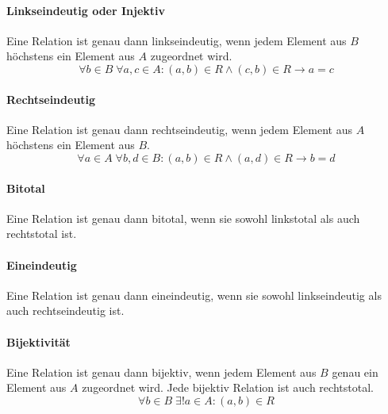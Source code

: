 \documentclass[../main.tex]{subfiles}
\begin{document}
                \paragraph{Linkseindeutig oder Injektiv}
	                Eine Relation ist genau dann linkseindeutig, wenn jedem Element aus $B$ höchstens ein Element aus $A$ zugeordnet wird.
                    \begin{equation}
                        \forall b \in B\; \forall a, c \in A\colon \left(a, b\right) \in R \wedge \left(c, b\right) \in R \rightarrow a = c
                    \end{equation}
                    
                \paragraph{Rechtseindeutig}
                    Eine Relation ist genau dann rechtseindeutig, wenn jedem Element aus $A$ höchstens ein Element aus $B$.
                    \begin{equation}
                        \forall a \in A\; \forall b, d \in B\colon \left(a, b\right) \in R \wedge \left(a, d\right) \in R \rightarrow b = d
                    \end{equation}
                    
                \paragraph{Bitotal}
                    Eine Relation ist genau dann bitotal, wenn sie sowohl linkstotal als auch rechtstotal ist.            
                    
                \paragraph{Eineindeutig}
                    Eine Relation ist genau dann eineindeutig, wenn sie sowohl linkseindeutig als auch rechtseindeutig ist.
                    
                \paragraph{Bijektivität}
                    Eine Relation ist genau dann bijektiv, wenn jedem Element aus $B$ genau ein Element aus $A$ zugeordnet wird. Jede bijektiv Relation ist auch rechtstotal. %
                    \begin{equation}
                        \forall b \in B\; \exists! a \in A\colon \left(a, b\right) \in R
                    \end{equation}
                    
\end{document}
